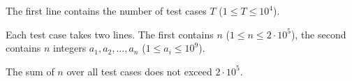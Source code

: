 The first line contains the number of test cases $T$ ($1 \le T \le 10^4$).

Each test case takes two lines. The first contains $n$ ($1 \le n \le 2 \cdot 10^5$), the second contains $n$ integers $a_1, a_2, \ldots, a_n$ ($1 \le a_i \le 10^9$).

The sum of $n$ over all test cases does not exceed $2 \cdot 10^5$.
